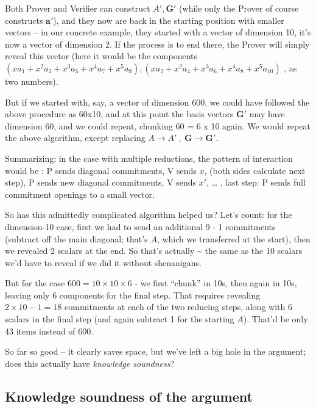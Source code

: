 \documentclass[10pt,a4paper]{article}
\begin{document}
Both Prover and Verifier can construct $A', \mathbf{G}'$ (while only the Prover of course
constructs $\mathbf{a}'$), and they now are back in the starting position with
smaller vectors -- in our concrete example, they started with a vector
of dimension 10, it's now a vector of dimension 2. If the process is to
end there, the Prover will simply reveal this vector (here it would be
the components $(xa_1 + x^2 a_3 + x^3 a_5 + x^4 a_7 + x^5 a_9), (xa_2 + x^2 a_4 + x^3 a_6 + x^4 a_8 + x^5 a_{10})$ , as two numbers).

But if we started with, say, a vector of dimension 600, we could have
followed the above procedure as 60x10, and at this point the basis
vectors $\mathbf{G}'$ may have dimension 60, and we could repeat, chunking 60 = 6 x 10
again. We would repeat the above algorithm, except replacing $A \rightarrow A' \ ,\ \mathbf{G} \rightarrow \mathbf{G}'$.

Summarizing: in the case with multiple reductions, the pattern of
interaction would be : P sends diagonal commitments, V sends $x$, (both
sides calculate next step), P sends new diagonal commitments, V sends $x'$,
\ldots{} , last step: P sends full commitment openings to a small
vector.

So has this admittedly complicated algorithm helped us? Let's count: for
the dimension-10 case, first we had to send an additional 9 - 1
commitments (subtract off the main diagonal; that's $A$, which we
transferred at the start), then we revealed 2 scalars at the end. So
that's actually \textasciitilde{} the same as the 10 scalars we'd have
to reveal if we did it without shenanigans.

But for the case $600 = 10 \times 10 \times 6$ - we first ``chunk'' in 10s, then
again in 10s, leaving only 6 components for the final step. That
requires revealing $2\times 10-1 = 18$ commitments at each of the two reducing
steps, along with 6 scalars in the final step (and again subtract 1 for
the starting $A$). That'd be only 43 items instead of 600.

So far so good -- it clearly saves space, but we've left a big hole in
the argument; does this actually have \emph{knowledge soundness}?

\hypertarget{knowledge-soundness-of-the-argument}{%
\subsection[Knowledge soundness of the
argument]{\texorpdfstring{\protect\hypertarget{anchor-45}{}{}Knowledge
soundness of the
argument}{Knowledge soundness of the argument}}\label{knowledge-soundness-of-the-argument}}
\end{document}
